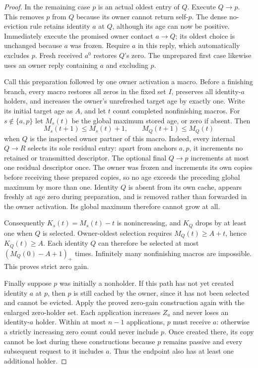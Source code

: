 \documentclass[11pt]{article}
\begin{document}
\begin{proof}
In the remaining case $p$ is an actual oldest entry of $Q$.
Execute $Q\to p$. This removes $p$ from $Q$ because its owner cannot
return self-$p$. The dense no-eviction rule retains identity $a$ at $Q$,
although its age can now be positive. Immediately execute the promised
owner contact $a\to Q$; its oldest choice is unchanged because $a$
was frozen. Require $a$ in this reply, which automatically excludes $p$.
Fresh received $a^0$ restores $Q$'s zero.
The unprepared first case likewise uses an owner reply containing
$a$ and excluding $p$.

Call this preparation followed by one owner activation a macro.
Before a finishing branch, every macro restores all zeros in the
fixed set $I$, preserves all identity-$a$ holders, and increases the
owner's unrefreshed target age by exactly one. Write its initial
target age as $A$, and let $t$ count completed nonfinishing macros.
For $s\notin\{a,p\}$ let $M_s(t)$ be the global maximum stored age,
or zero if absent. Then
\[
 M_s(t+1)\le M_s(t)+1,\qquad
 M_Q(t+1)\le M_Q(t)
\]
when $Q$ is the inspected owner partner of this macro.
Indeed, every internal $Q\to R$ selects its sole residual entry:
apart from anchors $a,p$, it increments no retained or transmitted
descriptor. The optional final $Q\to p$ increments at most one
residual descriptor once. The owner was frozen and increments its
own copies before receiving these prepared copies, so no age exceeds
the preceding global maximum by more than one. Identity $Q$ is absent
from its own cache, appears freshly at age zero during preparation,
and is removed rather than forwarded in the owner activation.
Its global maximum therefore cannot grow at all.

Consequently $K_s(t)=M_s(t)-t$ is nonincreasing, and $K_Q$ drops by
at least one when $Q$ is selected. Owner-oldest selection requires
$M_Q(t)\ge A+t$, hence $K_Q(t)\ge A$. Each identity $Q$ can therefore
be selected at most $(M_Q(0)-A+1)_+$ times. Infinitely many
nonfinishing macros are impossible. This proves strict zero gain.

Finally suppose $p$ was initially a nonholder. If this path has
not yet created identity $a$ at $p$, then $p$ is still cached by
the owner, since it has not been selected and cannot be evicted.
Apply the proved zero-gain construction again with the enlarged
zero-holder set. Each application increases $Z_a$ and never loses
an identity-$a$ holder. Within at most $n-1$ applications, $p$
must receive $a$: otherwise a strictly increasing zero count
could never include $p$. Once created there, its copy cannot
be lost during these constructions because $p$ remains passive
and every subsequent request to it includes $a$.
Thus the endpoint also has at least one additional holder.
\end{proof}
\end{document}
